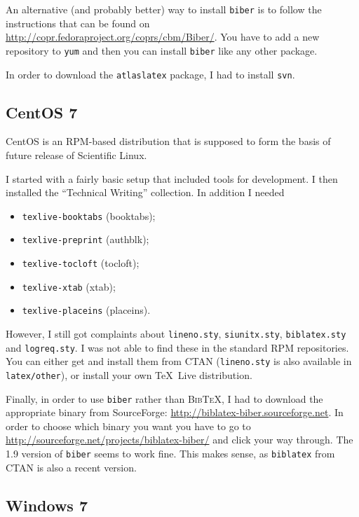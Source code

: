 \documentclass[atlasstyle,UKenglish]{latex/atlasdoc}
\newcommand{\BibTeX}{\textsc{Bib\TeX}}
\newcommand{\File}[1]{\texttt{#1}\xspace}
\newcommand{\Package}[1]{\texttt{#1}\xspace}
\begin{document}
An alternative (and probably better) way to install \Package{biber} is to follow the
instructions that can be found on
\url{http://copr.fedoraproject.org/coprs/cbm/Biber/}.
You have to add a new repository to \Package{yum} and then you
can install \Package{biber} like any other package.

In order to download the \Package{atlaslatex} package, I had to install \Package{svn}.


\subsection{CentOS 7} 

CentOS is an RPM-based distribution that is supposed to form the basis of future
release of Scientific Linux.

I started with a fairly basic setup that included tools for development.
I then installed the \enquote{Technical Writing} collection.
In addition I needed 
\begin{itemize}\setlength{\parskip}{0pt}\setlength{\itemsep}{0pt}
\item \Package{texlive-booktabs} (booktabs);
\item \Package{texlive-preprint} (authblk);
\item \Package{texlive-tocloft} (tocloft);
\item \Package{texlive-xtab} (xtab);
\item \Package{texlive-placeins} (placeins).
\end{itemize}
However, I still got complaints about \File{lineno.sty}, \File{siunitx.sty},
\File{biblatex.sty} and \File{logreq.sty}.
I was not able to find these in the standard RPM repositories.
You can either get and install them from CTAN (\File{lineno.sty} is also available in \File{latex/other}),
or install your own \TeX\ Live distribution.

Finally, in order to use \Package{biber} rather than \BibTeX,
I had to download the appropriate binary from SourceForge:
\url{http://biblatex-biber.sourceforge.net}.
In order to choose which binary you want you have to go to
\url{http://sourceforge.net/projects/biblatex-biber/} and click your way through.
The 1.9 version of \Package{biber} seems to work fine.
This makes sense, as \Package{biblatex} from CTAN is also a recent version.


\subsection{Windows 7}
\end{document}
